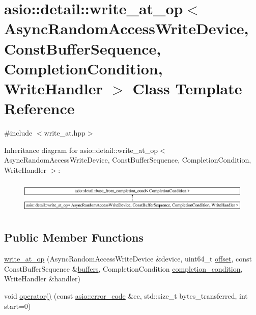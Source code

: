 \hypertarget{classasio_1_1detail_1_1write__at__op}{}\section{asio\+:\+:detail\+:\+:write\+\_\+at\+\_\+op$<$ Async\+Random\+Access\+Write\+Device, Const\+Buffer\+Sequence, Completion\+Condition, Write\+Handler $>$ Class Template Reference}
\label{classasio_1_1detail_1_1write__at__op}


{\ttfamily \#include $<$write\+\_\+at.\+hpp$>$}

Inheritance diagram for asio\+:\+:detail\+:\+:write\+\_\+at\+\_\+op$<$ Async\+Random\+Access\+Write\+Device, Const\+Buffer\+Sequence, Completion\+Condition, Write\+Handler $>$\+:\begin{figure}[H]
\begin{center}
\leavevmode
\includegraphics[height=1.588652cm]{classasio_1_1detail_1_1write__at__op}
\end{center}
\end{figure}
\subsection*{Public Member Functions}
\begin{DoxyCompactItemize}
\item 
\hyperlink{classasio_1_1detail_1_1write__at__op_a908ed53ed0853e51e05863cf2325a3e3}{write\+\_\+at\+\_\+op} (Async\+Random\+Access\+Write\+Device \&device, uint64\+\_\+t \hyperlink{group__async__read__at_ga8dcdb41a4adfd6fe5322b5dd666d9f29}{offset}, const Const\+Buffer\+Sequence \&\hyperlink{group__async__read_ga54dede45c3175148a77fe6635222c47d}{buffers}, Completion\+Condition \hyperlink{group__async__read_gae2e215d5013596cc2b385bb6c13fa518}{completion\+\_\+condition}, Write\+Handler \&handler)
\item 
void \hyperlink{classasio_1_1detail_1_1write__at__op_a7df9d03280c0bf386c003c99d539534f}{operator()} (const \hyperlink{classasio_1_1error__code}{asio\+::error\+\_\+code} \&ec, std\+::size\+\_\+t bytes\+\_\+transferred, int start=0)
\end{DoxyCompactItemize}
